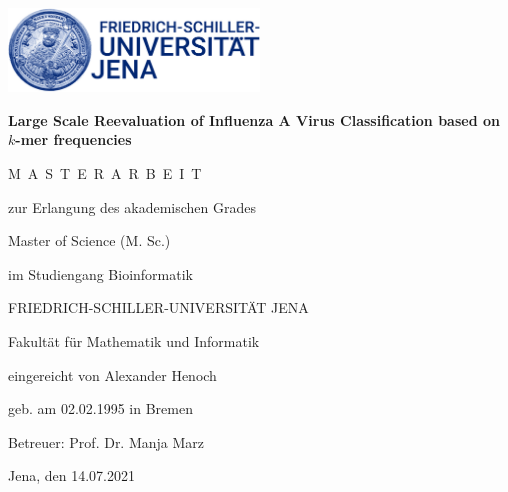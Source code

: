 \begin{titlepage}
    
    \centering 
    \large
    \includegraphics[width=0.5\textwidth]{Graphics/Logo.jpg}

    \vspace{5em}

    {\Large \textbf{Large Scale Reevaluation of Influenza A Virus Classification based on $k$-mer frequencies}}
    
    \vspace{5em}
    
    M~A~S~T~E~R~A~R~B~E~I~T
    
    \vspace{1em}
    
    zur Erlangung des akademischen Grades
    
    \vspace{1em}
    
    Master of Science (M. Sc.)
    
    im Studiengang Bioinformatik
    
    \vspace{1em}
    
    FRIEDRICH-SCHILLER-UNIVERSITÄT JENA
    
    Fakultät für Mathematik und Informatik
    
    \vfill
    
    eingereicht von Alexander Henoch
    
    geb. am 02.02.1995 in Bremen
    
    \vspace{1em}
    
    Betreuer: Prof. Dr. Manja Marz
    
    \vspace{1em}
    
    Jena, den 14.07.2021
    
\end{titlepage}